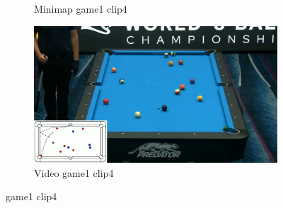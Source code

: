 \begin{figure}[H]
\begin{subfigure}[b]{0.48\textwidth}
    	\caption{Minimap game1 clip4}
    	\label{fig: game1_clip4_minimap}
    \end{subfigure}
    \begin{subfigure}[b]{0.48\textwidth}
    	\centering
    	\includegraphics[width=\textwidth]{images/Video/game1_clip4_video.jpg}
    	\caption{Video game1 clip4}
    	\label{fig: game1_clip4_video}
    \end{subfigure}

	\caption{game1 clip4}
\end{figure}


